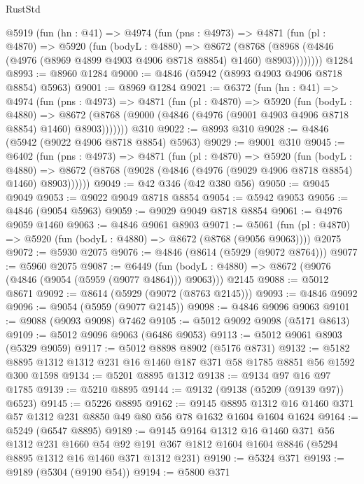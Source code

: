 \begin{lexlean}{RustStd}
\begin{coremodule}
    @5919
      (fun (hn : @41) =>
      @4974
        (fun (pns : @4973) =>
        @4871
          (fun (pl : @4870) =>
          @5920
            (fun (bodyL : @4880) =>
            @8672
              (@8768 (@8968 (@4846 (@4976 (@8969 @4899 @4903 @4906 @8718 @8854) @1460) @8903))))))))
    @1284
@8993 := @8960 @1284
@9000 := @4846 (@5942 (@8993 @4903 @4906 @8718 @8854) @5963)
@9001 := @8969 @1284
@9021 := @6372
    (fun (hn : @41) =>
    @4974
      (fun (pns : @4973) =>
      @4871
        (fun (pl : @4870) =>
        @5920
          (fun (bodyL : @4880) =>
          @8672 (@8768 (@9000 (@4846 (@4976 (@9001 @4903 @4906 @8718 @8854) @1460) @8903)))))))
    @310
@9022 := @8993 @310
@9028 := @4846 (@5942 (@9022 @4906 @8718 @8854) @5963)
@9029 := @9001 @310
@9045 := @6402
    (fun (pns : @4973) =>
    @4871
      (fun (pl : @4870) =>
      @5920
        (fun (bodyL : @4880) =>
        @8672 (@8768 (@9028 (@4846 (@4976 (@9029 @4906 @8718 @8854) @1460) @8903))))))
@9049 := @42 @346 (@42 @380 @56)
@9050 := @9045 @9049
@9053 := @9022 @9049 @8718 @8854
@9054 := @5942 @9053
@9056 := @4846 (@9054 @5963)
@9059 := @9029 @9049 @8718 @8854
@9061 := @4976 @9059 @1460
@9063 := @4846 @9061 @8903
@9071 := @5061
    (fun (pl : @4870) => @5920 (fun (bodyL : @4880) => @8672 (@8768 (@9056 @9063))))
    @2075
@9072 := @5930 @2075
@9076 := @4846 (@8614 (@5929 (@9072 @8764)))
@9077 := @5960 @2075
@9087 := @6449
    (fun (bodyL : @4880) => @8672 (@9076 (@4846 (@9054 (@5959 (@9077 @4864))) @9063)))
    @2145
@9088 := @5012 @8671
@9092 := @8614 (@5929 (@9072 (@8763 @2145)))
@9093 := @4846 @9092
@9096 := @9054 (@5959 (@9077 @2145))
@9098 := @4846 @9096 @9063
@9101 := @9088 (@9093 @9098) @7462
@9105 := @5012 @9092 @9098 (@5171 @8613)
@9109 := @5012 @9096 @9063 (@6486 @9053)
@9113 := @5012 @9061 @8903 (@5329 @9059)
@9117 := @5012 @8898 @8902 (@5176 @8731)
@9132 := @5182 @8895 @1312 @1312 @231 @16 @1460 @187 @371 @58 @1785 @8851 @56 @1592 @300 @1598
@9134 := @5201 @8895 @1312
@9138 := @9134 @97 @16 @97 @1785
@9139 := @5210 @8895
@9144 := @9132 (@9138 (@5209 (@9139 @97)) @6523)
@9145 := @5226 @8895
@9162 := @9145
    @8895
    @1312
    @16
    @1460
    @371
    @57
    @1312
    @231
    @8850
    @49
    @80
    @56
    @78
    @1632
    @1604
    @1604
    @1624
@9164 := @5249 (@6547 @8895)
@9189 := @9145
    @9164
    @1312
    @16
    @1460
    @371
    @56
    @1312
    @231
    @1660
    @54
    @92
    @191
    @367
    @1812
    @1604
    @1604
    @8846
    (@5294 @8895 @1312 @16 @1460 @371 @1312 @231)
@9190 := @5324 @371
@9193 := @9189 (@5304 (@9190 @54))
@9194 := @5800 @371

\end{coremodule}
\end{lexlean}
